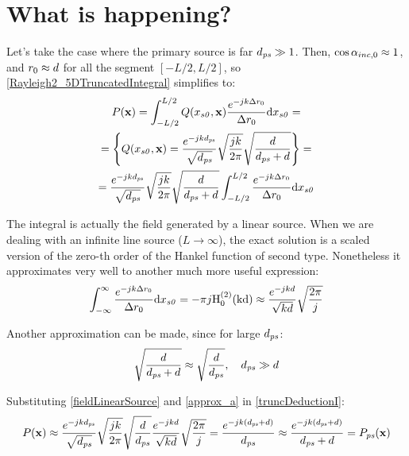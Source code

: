 \section{What is happening?}
Let's take the case where the primary source is far $d_{\PosTheoSubInd[primarySource]} \gg 1$. Then, $\cos\alpha_{inc,0} \approx 1$, and $r_0 \approx d$ for all the segment $[-L/2, L/2]$, so \autoref{Rayleigh2_5DTruncatedIntegral} simplifies to:
\begin{multline}
	P(\PosTheo) = \int_{-L/2}^{L/2} Q(x_{\PosTheoSubInd[section]}, \PosTheo) \frac{e^{-jk\distLinePoint}}{\distLinePoint} \mathrm{d}x_{\PosTheoSubInd[section]} =\\
	= \left\{Q(x_{\PosTheoSubInd[section]}, \PosTheo) =  \frac{e^{-jkd_{\PosTheoSubInd[primarySource]}}}{\sqrt{d_{\PosTheoSubInd[primarySource]}}} \sqrt{\frac{j k}{2\pi}} \sqrt{\frac{d}{d_{\PosTheoSubInd[primarySource]} + d}}\right\} = \\
	= \frac{e^{-jkd_{\PosTheoSubInd[primarySource]}}}{\sqrt{d_{\PosTheoSubInd[primarySource]}}} \sqrt{\frac{j k}{2\pi}} \sqrt{\frac{d}{d_{\PosTheoSubInd[primarySource]} + d}} \int_{-L/2}^{L/2} \frac{e^{-jk\distLinePoint}}{\distLinePoint} \mathrm{d}x_{\PosTheoSubInd[section]}
	\label{truncDeductionI}
\end{multline}

The integral is actually the field generated by a linear source. When we are dealing with an infinite line source ($L \to \infty$), the exact solution is a scaled version of the zero-th order of the Hankel function of second type. Nonetheless it approximates very well to another much more useful expression:
\begin{equation}
\int_{-\infty}^{\infty} \frac{e^{-jk\distLinePoint}}{\distLinePoint} \mathrm{d}x_{\PosTheoSubInd[section]} = -\pi j \mathrm{H_0^{(2)}(k d)} \approx \frac{e^{-jkd}}{\sqrt{kd}}\sqrt{\frac{2\pi}{j}}
\label{fieldLinearSource}
\end{equation}

Another approximation can be made, since for large $d_{\PosTheoSubInd[primarySource]}$:
\begin{equation}
\sqrt{\frac{d}{d_{\PosTheoSubInd[primarySource]} + d}} \approx \sqrt{\frac{d}{d_{\PosTheoSubInd[primarySource]}}}, \quad d_{\PosTheoSubInd[primarySource]} \gg d 
\label{approx_a}
\end{equation}

Substituting \autoref{fieldLinearSource} and \autoref{approx_a} in \autoref{truncDeductionI}:
\begin{equation}
	P(\PosTheo) \approx \frac{e^{-jkd_{\PosTheoSubInd[primarySource]}}}{\sqrt{d_{\PosTheoSubInd[primarySource]}}} \sqrt{\frac{j k}{2\pi}} \sqrt{\frac{d}{d_{\PosTheoSubInd[primarySource]}}} \frac{e^{-jkd}}{\sqrt{kd}}\sqrt{\frac{2\pi}{j}} = \frac{e^{-jk(d_{\PosTheoSubInd[primarySource]} + d)}}{d_{\PosTheoSubInd[primarySource]}} \approx \frac{e^{-jk(d_{\PosTheoSubInd[primarySource]} + d)}}{d_{\PosTheoSubInd[primarySource]} + d} = P_{\PosTheoSubInd[primarySource]}(\PosTheo)
\end{equation}

